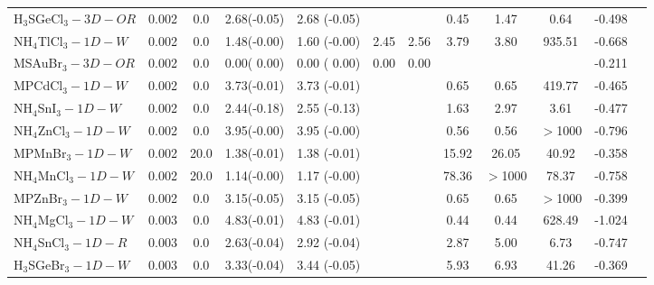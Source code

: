 \begin{table*}
\begin{tabular*}{0.98\textwidth}{@{\extracolsep{\fill}}l c c c c c c c c c c c}
H$_3$SGeCl$_3-3D-OR$&      0.002&        0.0&       2.68(-0.05)&            2.68  (-0.05)&           &                &            0.45&            1.47&            0.64&     -0.498\\
 NH$_4$TlCl$_3-1D-W$&      0.002&        0.0&       1.48(-0.00)&            1.60  (-0.00)&       2.45&            2.56&            3.79&            3.80&          935.51&     -0.668\\
    MSAuBr$_3-3D-OR$&      0.002&        0.0&       0.00( 0.00)&            0.00  ( 0.00)&       0.00&            0.00&                &                &                &     -0.211\\
     MPCdCl$_3-1D-W$&      0.002&        0.0&       3.73(-0.01)&            3.73  (-0.01)&           &                &            0.65&            0.65&          419.77&     -0.465\\
  NH$_4$SnI$_3-1D-W$&      0.002&        0.0&       2.44(-0.18)&            2.55  (-0.13)&           &                &            1.63&            2.97&            3.61&     -0.477\\
 NH$_4$ZnCl$_3-1D-W$&      0.002&        0.0&       3.95(-0.00)&            3.95  (-0.00)&           &                &            0.56&            0.56&         $>$1000&     -0.796\\
     MPMnBr$_3-1D-W$&      0.002&       20.0&       1.38(-0.01)&            1.38  (-0.01)&           &                &           15.92&           26.05&           40.92&     -0.358\\
 NH$_4$MnCl$_3-1D-W$&      0.002&       20.0&       1.14(-0.00)&            1.17  (-0.00)&           &                &           78.36&         $>$1000&           78.37&     -0.758\\
     MPZnBr$_3-1D-W$&      0.002&        0.0&       3.15(-0.05)&            3.15  (-0.05)&           &                &            0.65&            0.65&         $>$1000&     -0.399\\
 NH$_4$MgCl$_3-1D-W$&      0.003&        0.0&       4.83(-0.01)&            4.83  (-0.01)&           &                &            0.44&            0.44&          628.49&     -1.024\\
 NH$_4$SnCl$_3-1D-R$&      0.003&        0.0&       2.63(-0.04)&            2.92  (-0.04)&           &                &            2.87&            5.00&            6.73&     -0.747\\
 H$_3$SGeBr$_3-1D-W$&      0.003&        0.0&       3.33(-0.04)&            3.44  (-0.05)&           &                &            5.93&            6.93&           41.26&     -0.369\\
   \hline 
    \end{tabular*}
 \end{table*}
